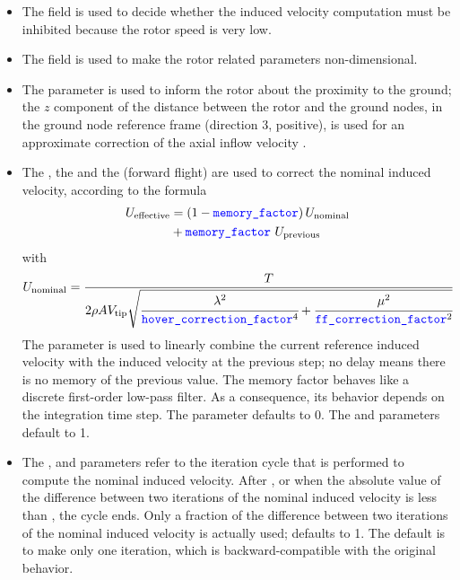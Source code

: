 \begin{itemize}
\item
The  field is used to decide whether
the induced velocity computation must be inhibited because the rotor speed
is very low.

\item
The  field is used to make the rotor related parameters
non-dimensional.

\item
The  parameter is used to inform the rotor about the proximity
to the ground; the $z$ component of the distance between the rotor
and the ground nodes, in the ground node reference frame
(direction 3, positive),
is used for an approximate correction of the axial inflow velocity
\cite{NASA-TR-3021}.

\item
The , the 
and the  (forward flight) are
used to correct the nominal induced velocity, according to the formula
\begin{align*}
	U_{\text{effective}}
	&=
	\left( 1 - \textcolor{blue}{\texttt{memory\_factor}} \right) U_{\text{nominal}}
	\\
	&+ \textcolor{blue}{\texttt{memory\_factor}} \ U_{\text{previous}}
\end{align*}
with
\begin{align*}
	U_{\text{nominal}}
	&=
	\frac{T}{2 \rho A V_{\text{tip}} \sqrt{
		\cfrac{\lambda^2}{\textcolor{blue}{\texttt{hover\_correction\_factor}}^4}
		+ \cfrac{\mu^2}{\textcolor{blue}{\texttt{ff\_correction\_factor}}^2}
	}}
\end{align*}
The  parameter is used to linearly combine the current
reference induced velocity with the induced velocity at the previous step;
no delay means there is no memory of the previous value.
The memory factor behaves like a discrete first-order low-pass filter.
As a consequence, its behavior depends on the integration time step.
The  parameter defaults to 0.
The 
and  parameters default to 1.

\item
The , 
and  parameters refer to the iteration cycle
that is performed to compute the nominal induced velocity.
After , or when the absolute value
of the difference between two iterations of the nominal induced
velocity is less than , the cycle ends.
Only a fraction  of the difference between two
iterations of the nominal induced velocity is actually
used;  defaults to 1.
The default is to make only one iteration, which is backward-compatible
with the original behavior.
\end{itemize}

